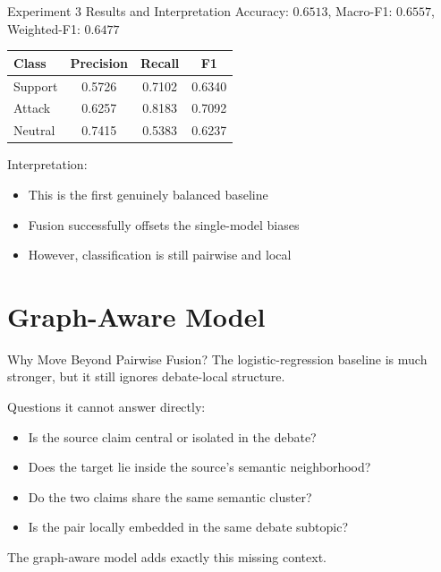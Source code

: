 \documentclass[aspectratio=169]{beamer}
\begin{document}
\begin{frame}{Experiment 3 Results and Interpretation}
Accuracy: \(0.6513\), Macro-F1: \(0.6557\), Weighted-F1: \(0.6477\)

\vspace{0.3cm}
\centering
\begin{tabular}{lccc}
\toprule
Class & Precision & Recall & F1 \\
\midrule
Support & 0.5726 & 0.7102 & 0.6340 \\
Attack & 0.6257 & 0.8183 & 0.7092 \\
Neutral & 0.7415 & 0.5383 & 0.6237 \\
\bottomrule
\end{tabular}

\vspace{0.4cm}
Interpretation:
\begin{itemize}
  \item This is the first genuinely balanced baseline
  \item Fusion successfully offsets the single-model biases
  \item However, classification is still pairwise and local
\end{itemize}
\end{frame}

\section{Graph-Aware Model}

\begin{frame}{Why Move Beyond Pairwise Fusion?}
The logistic-regression baseline is much stronger, but it still ignores debate-local structure.

Questions it cannot answer directly:
\begin{itemize}
  \item Is the source claim central or isolated in the debate?
  \item Does the target lie inside the source's semantic neighborhood?
  \item Do the two claims share the same semantic cluster?
  \item Is the pair locally embedded in the same debate subtopic?
\end{itemize}

The graph-aware model adds exactly this missing context.
\end{frame}
\end{document}
